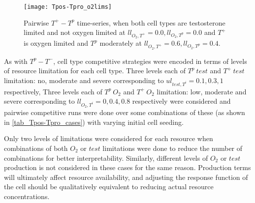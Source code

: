 \begin{figure}[h!]
  \centering
  \texttt{[image: Tpos-Tpro\_o2lims]}
  \caption[Pairwise $T^+ - T^p$ time-series, oxygen limitation]{Pairwise $T^+ - T^p$ time-series, when both cell types are testosterone limited and not oxygen limited at $ll_{O_2,T^+}=0.0, ll_{O_2,T^p}=0.0$ and $T^+$ is oxygen limited and $T^p$ moderately at $ll_{O_2,T^+}=0.6, ll_{O_2,T^p}=0.4$.}
  \label{fig_Tpos-Tpro_o2lims}
\end{figure}

As with $T^p-T^-$, cell type competitive strategies were encoded in terms of levels of resource limitation for each cell type. Three levels each of $T^p\ test$ and $T^+\ test$ limitation: no, moderate and severe corresponding to $ul_{test,T^i}=0.1, 0.3, 1$ respectively, Three levels each of $T^p\ O_2$ and $T^+\ O_2$ limitation: low, moderate and severe corresponding to $ll_{O_2,T^i}=0, 0.4, 0.8$ respectively were considered and pairwise competitive runs were done over some combinations of these (as shown in \autoref{tab_Tpos-Tpro_cases}) with varying initial cell seeding.

Only two levels of limitations were considered for each resource when combinations of both $O_2$ or $test$ limitations were done to reduce the number of combinations for better interpretability. Similarly, different levels of $O_2$ or $test$ production is not considered in these cases for the same reason. Production terms will ultimately affect resource availability, and adjusting the response function of the cell should be qualitatively equivalent to reducing actual resource concentrations.

